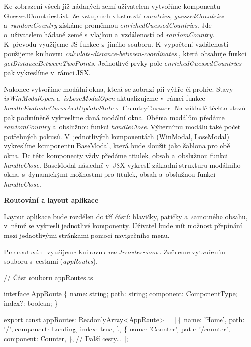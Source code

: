 Ke zobrazení všech již hádaných zemí uživatelem vytvoříme komponentu GuessedCountriesList. Ze vstupních vlastností \emph{countries}, \emph{guessedCountries} a~\emph{randomCountry} získáme proměnnou \emph{enrichedGuessedCountries}. 
Jde o~uživatelem hádané země s~vlajkou a~vzdáleností od \emph{randomCountry}. K~převodu využijeme JS funkce z~jiného souboru. 
K~vypočtení vzdálenosti použijeme knihovnu \emph{calculate-distance-between-coordinates} \cite{distancebetweencoordinates}, která obsahuje funkci \emph{getDistanceBetweenTwoPoints}. 
Jednotlivé prvky pole \emph{enrichedGuessedCountries} pak vykreslíme v~rámci JSX.

Nakonec vytvoříme modální okna, která se zobrazí při výhře či prohře. Stavy \emph{isWinModalOpen} a~\emph{isLoseModalOpen} aktualizujeme v~rámci funkce \emph{handleEvaluateGuessAndUpdateState} v~CountryGuesser. 
Na základě těchto stavů pak podmíněně vykreslíme daná modální okna. Oběma modálům předáme \emph{randomCountry} a~obslužnou funkci \emph{handleClose}. Výhernímu modálu také počet potřebných pokusů. 
V~jednotlivých komponentách (WinModal, LoseModal) vykreslíme komponentu BaseModal, která bude sloužit jako šablona pro obě okna. Do této komponenty vždy předáme titulek, obsah a~obslužnou funkci \emph{handleClose}. 
BaseModal následně v~JSX vykreslí základní strukturu modálního okna, s~dynamickými možnostmi pro titulek, obsah a~obslužnou funkci \emph{handleClose}.

\begin{flushleft}
  \textbf{Routování a layout aplikace}
\end{flushleft}

Layout aplikace bude rozdělen do tří částí: hlavičky, patičky a~samotného obsahu, v~němž se vykreslí jednotlivé komponenty. Uživatel bude mít možnost přepínání mezi jednotlivými stránkami pomocí navigačního menu.

Pro routování využijeme knihovnu \emph{react-router-dom} \cite{reactrouter}. Začneme vytvořením souboru s~cestami (\emph{appRoutes}).

\begin{prog}
// Část souboru appRoutes.ts

interface AppRoute \{
  name: string;
  path: string;
  component: ComponentType;
  index?: boolean;
\}

export const appRoutes: ReadonlyArray<AppRoute> = [
  \{
    name: 'Home',
    path: '/',
    component: Landing,
    index: true,
  \},
  \{
    name: 'Counter',
    path: '/counter',
    component: Counter,
  \},
  // Další cesty...
];
\end{prog}

